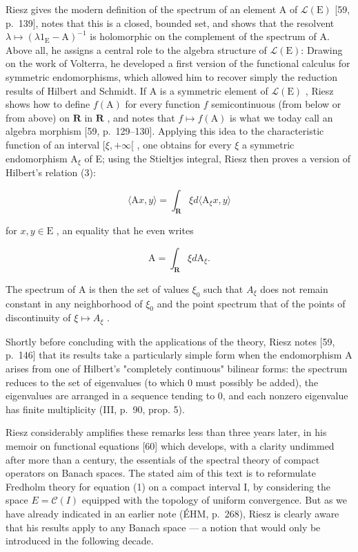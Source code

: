Riesz gives the modern definition of the spectrum of an element A of \(\mathcal{L}(\mathrm{E})\) [59, p.~139], notes that this is a closed, bounded set, and shows that the resolvent \(\lambda \mapsto (\lambda 1_{\mathrm{E}} - \mathrm{A})^{-1}\) is holomorphic on the complement of the spectrum of A. Above all, he assigns a central role to the algebra structure of \(\mathcal{L}(\mathrm{E})\): Drawing on the work of Volterra, he developed a first version of the functional calculus for symmetric endomorphisms, which allowed him to recover simply the reduction results of Hilbert and Schmidt. If A is a symmetric element of \(\mathcal{L}(\mathrm{E})\) , Riesz shows how to define \(f(\mathrm{A})\) for every function \(f\) semicontinuous (from below or from above) on \(\mathbf{R}\) in \(\mathbf{R}\) , and notes that \(f \mapsto f(\mathrm{A})\) is what we today call an algebra morphism [59, p.~129--130]. Applying this idea to the characteristic function of an interval \([\xi, +\infty[\) , one obtains for every \(\xi\) a symmetric endomorphism \(\mathrm{A}_{\xi}\) of E; using the Stieltjes integral, Riesz then proves a version of Hilbert's relation (3):

\[
\langle \mathrm{A} x, y \rangle = \int_ {\mathbf {R}} \xi d \langle \mathrm{A} _ {\xi} x, y \rangle
\]

for \(x, y \in \mathrm{E}\) , an equality that he even writes

\[
\mathrm{A} = \int_ {\mathbf {R}} \xi d \mathrm{A} _ {\xi}.
\]

The spectrum of A is then the set of values \(\xi_{0}\) such that \(A_{\xi}\) does not remain constant in any neighborhood of \(\xi_{0}\) and the point spectrum that of the points of discontinuity of \(\xi \mapsto A_{\xi}\) .

Shortly before concluding with the applications of the theory, Riesz notes [59, p.~146] that its results take a particularly simple form when the endomorphism A arises from one of Hilbert's "completely continuous" bilinear forms: the spectrum reduces to the set of eigenvalues (to which 0 must possibly be added), the eigenvalues are arranged in a sequence tending to 0, and each nonzero eigenvalue has finite multiplicity (III, p.~90, prop. 5).


Riesz considerably amplifies these remarks less than three years later, in his memoir on functional equations [60] which develops, with a clarity undimmed after more than a century, the essentials of the spectral theory of compact operators on Banach spaces. The stated aim of this text is to reformulate Fredholm theory for equation (1) on a compact interval I, by considering the space \(E = \mathcal{C}(I)\) equipped with the topology of uniform convergence. But as we have already indicated in an earlier note (ÉHM, p.~268), Riesz is clearly aware that his results apply to any Banach space — a notion that would only be introduced in the following decade.

